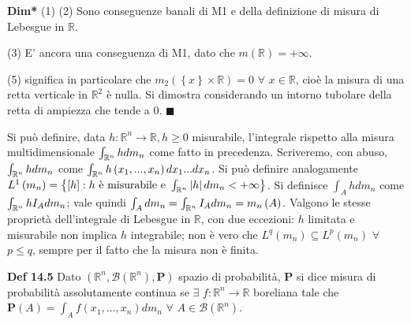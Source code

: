 \documentclass{article}
\begin{document}
\textbf{Dim*} (1) (2) Sono conseguenze banali di M1 e della definizione di
misura di Lebesgue in $%
\mathbb{R}
$.

(3) E' ancora una conseguenza di M1, dato che $m\left( 
\mathbb{R}
\right) =+\infty $.

(5) significa in particolare che $m_{2}\left( \left\{ x\right\} \times 
\mathbb{R}
\right) =0$ $\forall $ $x\in 
\mathbb{R}
$, cio\`{e} la misura di una retta verticale in $%
\mathbb{R}
^{2}$ \`{e} nulla. Si dimostra considerando un intorno tubolare della retta
di ampiezza che tende a $0$. $\blacksquare $

Si pu\`{o} definire, data $h:%
\mathbb{R}
^{n}\rightarrow 
\mathbb{R}
,h\geq 0$ misurabile, l'integrale rispetto alla misura multidimensionale $%
\int_{%
\mathbb{R}
^{n}}hdm_{n}$ come fatto in precedenza. Scriveremo, con abuso, $\int_{%
\mathbb{R}
^{n}}hdm_{n}$ come $\int_{%
\mathbb{R}
^{n}}h\left( x_{1},...,x_{n}\right) dx_{1}...dx_{n}$. Si pu\`{o} definire
analogamente $L^{1}\left( m_{n}\right) =\left\{ \left[ h\right] :h\text{ 
\`{e} misurabile e }\int_{%
\mathbb{R}
^{n}}\left\vert h\right\vert dm_{n}<+\infty \right\} $. Si definisce $%
\int_{A}hdm_{n}$ come $\int_{%
\mathbb{R}
^{n}}hI_{A}dm_{n}$; vale quindi $\int_{A}dm_{n}=\int_{%
\mathbb{R}
^{n}}I_{A}dm_{n}=m_{n}\left( A\right) $. Valgono le stesse propriet\`{a}
dell'integrale di Lebesgue in $%
\mathbb{R}
$, con due eccezioni: $h$ limitata e misurabile non implica $h$ integrabile;
non \`{e} vero che $L^{q}\left( m_{n}\right) \subseteq L^{p}\left(
m_{n}\right) $ $\forall $ $p\leq q$, sempre per il fatto che la misura non 
\`{e} finita.

\textbf{Def 14.5} Dato $\left( 
\mathbb{R}
^{n},\mathcal{B}\left( 
\mathbb{R}
^{n}\right) ,\mathbf{P}\right) $ spazio di probabilit\`{a}, $\mathbf{P}$ si
dice misura di probabilit\`{a} assolutamente continua se $\exists $ $f:%
\mathbb{R}
^{n}\rightarrow 
\mathbb{R}
$ boreliana tale che $\mathbf{P}\left( A\right) =\int_{A}f\left(
x_{1},...,x_{n}\right) dm_{n}$ $\forall $ $A\in \mathcal{B}\left( 
\mathbb{R}
^{n}\right) $.
\end{document}

